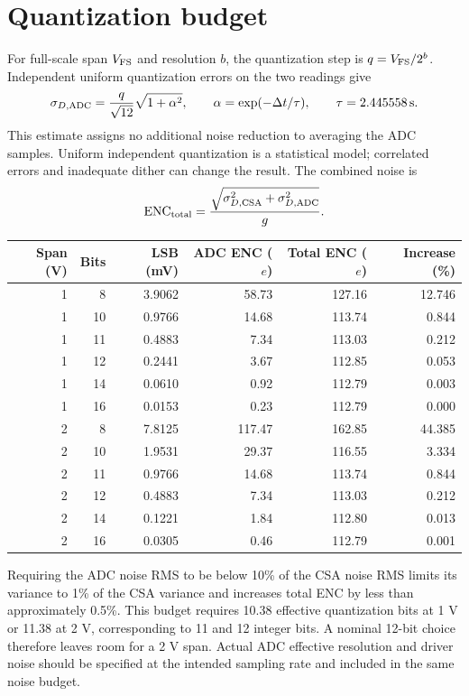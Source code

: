 \documentclass[11pt,a4paper]{article}
\begin{document}
\section*{Quantization budget}
For full-scale span $V_{\rm FS}$ and resolution $b$, the quantization step is
$q=V_{\rm FS}/2^b$. Independent uniform quantization errors on the two
readings give
\begin{equation}
 \sigma_{D,\rm ADC}=\frac{q}{\sqrt{12}}\sqrt{1+\alpha^2},
 \qquad \alpha=\exp(-\Delta t/\tau),\qquad \tau=2.445558\,\mathrm{s}.
\end{equation}
This estimate assigns no additional noise reduction to averaging the ADC
samples. Uniform independent quantization is a statistical model; correlated
errors and inadequate dither can change the result. The combined noise is
\begin{equation}
 \mathrm{ENC}_{\rm total}=
 \frac{\sqrt{\sigma_{D,\rm CSA}^2+\sigma_{D,\rm ADC}^2}}{g}.
\end{equation}

\begin{center}\begin{tabular}{rrrrrr}\toprule
Span (V) & Bits & LSB (mV) & ADC ENC ($e$) & Total ENC ($e$) & Increase (\%)\\\midrule
1 & 8 & 3.9062 & 58.73 & 127.16 & 12.746 \\
1 & 10 & 0.9766 & 14.68 & 113.74 & 0.844 \\
1 & 11 & 0.4883 & 7.34 & 113.03 & 0.212 \\
1 & 12 & 0.2441 & 3.67 & 112.85 & 0.053 \\
1 & 14 & 0.0610 & 0.92 & 112.79 & 0.003 \\
1 & 16 & 0.0153 & 0.23 & 112.79 & 0.000 \\
2 & 8 & 7.8125 & 117.47 & 162.85 & 44.385 \\
2 & 10 & 1.9531 & 29.37 & 116.55 & 3.334 \\
2 & 11 & 0.9766 & 14.68 & 113.74 & 0.844 \\
2 & 12 & 0.4883 & 7.34 & 113.03 & 0.212 \\
2 & 14 & 0.1221 & 1.84 & 112.80 & 0.013 \\
2 & 16 & 0.0305 & 0.46 & 112.79 & 0.001 \\
\bottomrule\end{tabular}\end{center}

Requiring the ADC noise RMS to be below 10\% of the CSA noise RMS
limits its variance to 1\% of the CSA variance and increases total ENC
by less than approximately 0.5\%. This budget requires
10.38 effective quantization bits at 1 V or 11.38 at 2 V, corresponding
to 11 and 12 integer bits. A nominal 12-bit choice therefore leaves
room for a 2 V span. Actual ADC effective resolution and driver noise
should be specified at the intended sampling rate and included in the
same noise budget.
\end{document}
